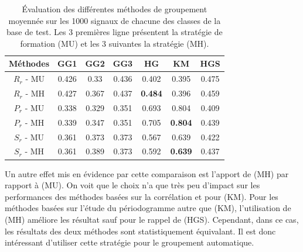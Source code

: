 \documentclass{gretsi}
\begin{document}
\begin{table}[h]
\begin{tabular}{|c|c|c|c|c|c|c|}
	\hline
	Méthodes & GG1 & GG2 & GG3 & HG & KM & HGS\\\hline 
	$R_r$ - MU & 0.426 & 0.33 & 0.436 & 0.402 & 0.395 & 0.475\\\hline
$R_r$ - MH & 0.427 & 0.367 & 0.437 & \textbf{0.484} & 0.396 & 0.459\\\hline
$P_r$ - MU & 0.338 & 0.329 & 0.351 & 0.693 & 0.804 & 0.409\\\hline
$P_r$ - MH & 0.339 & 0.347 & 0.351 & 0.705 & \textbf{0.804} & 0.439\\\hline
$S_r$ - MU & 0.361 & 0.373 & 0.373 & 0.567 & 0.639 & 0.422\\\hline
$S_r$ - MH & 0.361 & 0.389 & 0.373 & 0.592 & \textbf{0.639} & 0.437\\\hline

\end{tabular}
\caption{\'Evaluation des différentes méthodes de groupement moyennée sur les 1000 signaux de chacune des classes de la base de test. Les 3 premières ligne présentent la stratégie de formation (MU) et les 3 suivantes la stratégie (MH).}
\label{tab:res}
\end{table}

Un autre effet mis en évidence par cette comparaison est l'apport de (MH) par rapport à (MU).
On voit que le choix n'a que très peu d'impact sur les performances des méthodes basées sur la corrélation et pour (KM).
Pour les méthodes basées sur l'étude du périodogramme autre que (KM), l'utilisation de (MH) améliore les résultat sauf pour le rappel de (HGS). 
Cependant, dans ce cas, les résultats des deux méthodes sont statistiquement équivalant.
Il est donc intéressant d'utiliser cette stratégie pour le groupement automatique.
\end{document}
